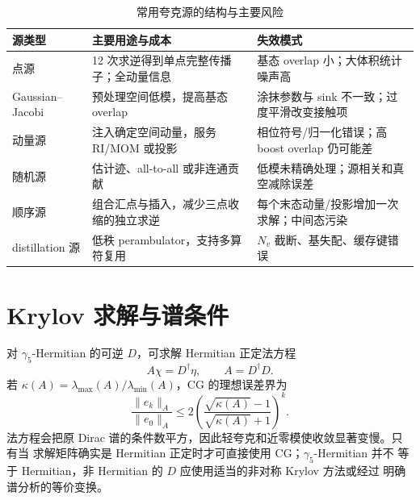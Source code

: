 \begin{table}[htbp]
\centering
\caption{常用夸克源的结构与主要风险}
\label{tab:b03-source-types}
\begin{tabularx}{\textwidth}{@{}>{\raggedright\arraybackslash}p{}X X@{}}
\toprule
源类型 & 主要用途与成本 & 失效模式 \\
\midrule
点源 & 12 次求逆得到单点完整传播子；全动量信息 & 基态 overlap 小；大体积统计噪声高 \\
Gaussian--Jacobi & 预处理空间低模，提高基态 overlap & 涂抹参数与 sink 不一致；过度平滑改变接触项 \\
动量源 & 注入确定空间动量，服务 RI/MOM 或投影 & 相位符号/归一化错误；高 boost overlap 仍可能差 \\
随机源 & 估计迹、all-to-all 或非连通贡献 & 低模未精确处理；源相关和真空减除误差 \\
顺序源 & 组合汇点与插入，减少三点收缩的独立求逆 & 每个末态动量/投影增加一次求解；中间态污染 \\
distillation 源 & 低秩 perambulator，支持多算符复用 & \(N_v\) 截断、基失配、缓存键错误 \\
\bottomrule
\end{tabularx}
\end{table}

\section{Krylov 求解与谱条件}

对 \(\gamma_5\)-Hermitian 的可逆 \(D\)，可求解 Hermitian 正定法方程
\begin{equation}
  A\chi=D^\dagger\eta,
  \qquad A=D^\dagger D.
  \label{eq:b03-normal-equation}
\end{equation}
若 \(\kappa(A)=\lambda_{\max}(A)/\lambda_{\min}(A)\)，CG 的理想误差界为
\begin{equation}
  \frac{\|e_k\|_A}{\|e_0\|_A}
  \leq 2\left(\frac{\sqrt{\kappa(A)}-1}{\sqrt{\kappa(A)}+1}\right)^k .
  \label{eq:b03-cg-bound}
\end{equation}
法方程会把原 Dirac 谱的条件数平方，因此轻夸克和近零模使收敛显著变慢。只有当
求解矩阵确实是 Hermitian 正定时才可直接使用 CG；\(\gamma_5\)-Hermitian 并不
等于 Hermitian，非 Hermitian 的 \(D\) 应使用适当的非对称 Krylov 方法或经过
明确谱分析的等价变换。

